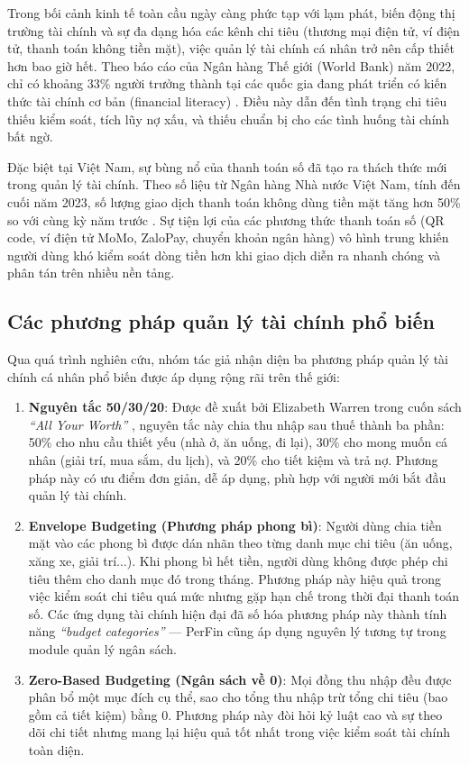 Trong bối cảnh kinh tế toàn cầu ngày càng phức tạp với lạm phát, biến động thị trường tài chính và sự đa dạng hóa các kênh chi tiêu (thương mại điện tử, ví điện tử, thanh toán không tiền mặt), việc quản lý tài chính cá nhân trở nên cấp thiết hơn bao giờ hết. Theo báo cáo của Ngân hàng Thế giới (World Bank) năm 2022, chỉ có khoảng 33\% người trưởng thành tại các quốc gia đang phát triển có kiến thức tài chính cơ bản (financial literacy) \cite{ref2}. Điều này dẫn đến tình trạng chi tiêu thiếu kiểm soát, tích lũy nợ xấu, và thiếu chuẩn bị cho các tình huống tài chính bất ngờ.

Đặc biệt tại Việt Nam, sự bùng nổ của thanh toán số đã tạo ra thách thức mới trong quản lý tài chính. Theo số liệu từ Ngân hàng Nhà nước Việt Nam, tính đến cuối năm 2023, số lượng giao dịch thanh toán không dùng tiền mặt tăng hơn 50\% so với cùng kỳ năm trước \cite{ref3}. Sự tiện lợi của các phương thức thanh toán số (QR code, ví điện tử MoMo, ZaloPay, chuyển khoản ngân hàng) vô hình trung khiến người dùng khó kiểm soát dòng tiền hơn khi giao dịch diễn ra nhanh chóng và phân tán trên nhiều nền tảng.

\subsection{Các phương pháp quản lý tài chính phổ biến}
\label{subsec:budgeting_methods}

Qua quá trình nghiên cứu, nhóm tác giả nhận diện ba phương pháp quản lý tài chính cá nhân phổ biến được áp dụng rộng rãi trên thế giới:

\begin{enumerate}
    \item \textbf{Nguyên tắc 50/30/20}: Được đề xuất bởi Elizabeth Warren trong cuốn sách \textit{``All Your Worth''} \cite{ref4}, nguyên tắc này chia thu nhập sau thuế thành ba phần: 50\% cho nhu cầu thiết yếu (nhà ở, ăn uống, đi lại), 30\% cho mong muốn cá nhân (giải trí, mua sắm, du lịch), và 20\% cho tiết kiệm và trả nợ. Phương pháp này có ưu điểm đơn giản, dễ áp dụng, phù hợp với người mới bắt đầu quản lý tài chính.

    \item \textbf{Envelope Budgeting (Phương pháp phong bì)}: Người dùng chia tiền mặt vào các phong bì được dán nhãn theo từng danh mục chi tiêu (ăn uống, xăng xe, giải trí...). Khi phong bì hết tiền, người dùng không được phép chi tiêu thêm cho danh mục đó trong tháng. Phương pháp này hiệu quả trong việc kiểm soát chi tiêu quá mức nhưng gặp hạn chế trong thời đại thanh toán số. Các ứng dụng tài chính hiện đại đã số hóa phương pháp này thành tính năng \textit{``budget categories''} --- PerFin cũng áp dụng nguyên lý tương tự trong module quản lý ngân sách.

    \item \textbf{Zero-Based Budgeting (Ngân sách về 0)}: Mọi đồng thu nhập đều được phân bổ một mục đích cụ thể, sao cho tổng thu nhập trừ tổng chi tiêu (bao gồm cả tiết kiệm) bằng 0. Phương pháp này đòi hỏi kỷ luật cao và sự theo dõi chi tiết nhưng mang lại hiệu quả tốt nhất trong việc kiểm soát tài chính toàn diện.
\end{enumerate}


